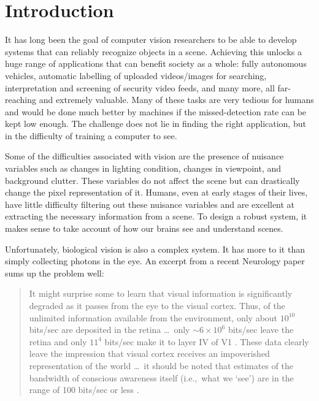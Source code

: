 \chapter{Introduction}\label{ch:intro}

\def \path {other}
\def \imgpath {\path/images}

It has long been the goal of computer vision researchers to be able to develop
systems that can reliably recognize objects in a scene. Achieving this unlocks a huge
range of applications that can benefit society as a whole: fully
autonomous vehicles, automatic labelling of uploaded videos/images for
searching, interpretation and screening of security video feeds, and many more,
all far-reaching and extremely valuable. Many of these tasks are very tedious for humans
and would be done much better by machines if the missed-detection rate can be
kept low enough. The challenge does not lie in finding the
right application, but in the difficulty of training a computer to see.

Some of the difficulties associated with vision are the presence of nuisance
variables such as changes in lighting condition, changes in viewpoint, and
background clutter. These variables do not affect the scene but can drastically change the pixel
representation of it.
Humans, even at early stages of their lives, have little difficulty filtering
out these nuisance variables and are excellent at extracting the necessary information from a scene.
To design a robust system, it makes sense to take account of how our brains see
and understand scenes.

Unfortunately, biological vision is also a complex system. It has
more to it than simply collecting photons in the eye.
An excerpt from a recent Neurology paper \cite{raichle_two_2010} sums up the problem
well:

\begin{quotation}
It might surprise some to learn that visual information is significantly
degraded as it passes from the eye to the visual cortex. Thus, of the unlimited
information available from the environment, only about $10^{10}$ bits/sec are
deposited in the retina \ldots\ only $\sim 6\times 10^6$
bits/sec leave the retina and only $11^4$ bits/sec make it to layer IV of V1
\cite{anderson_directed_2005,tor_norretranders_user_1998}. These data
clearly leave the impression that visual cortex receives an impoverished
representation of the world \ldots\ it should be noted that estimates of the
bandwidth of conscious awareness itself (i.e.,\ what we `see') are in the range
of 100 bits/sec or less \cite{anderson_directed_2005,
tor_norretranders_user_1998}.
\end{quotation}

